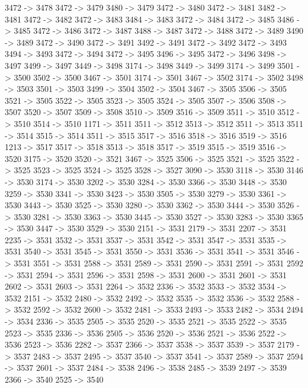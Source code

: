 {	3472 -> 3478
	3472 -> 3479
	3480 -> 3479
	3472 -> 3480
	3472 -> 3481
	3482 -> 3481
	3472 -> 3482
	3472 -> 3483
	3484 -> 3483
	3472 -> 3484
	3472 -> 3485
	3486 -> 3485
	3472 -> 3486
	3472 -> 3487
	3488 -> 3487
	3472 -> 3488
	3472 -> 3489
	3490 -> 3489
	3472 -> 3490
	3472 -> 3491
	3492 -> 3491
	3472 -> 3492
	3472 -> 3493
	3494 -> 3493
	3472 -> 3494
	3472 -> 3495
	3496 -> 3495
	3472 -> 3496
	3498 -> 3497
	3499 -> 3497
	3449 -> 3498
	3174 -> 3498
	3449 -> 3499
	3174 -> 3499
	3501 -> 3500
	3502 -> 3500
	3467 -> 3501
	3174 -> 3501
	3467 -> 3502
	3174 -> 3502
	3498 -> 3503
	3501 -> 3503
	3499 -> 3504
	3502 -> 3504
	3467 -> 3505
	3506 -> 3505
	3521 -> 3505
	3522 -> 3505
	3523 -> 3505
	3524 -> 3505
	3507 -> 3506
	3508 -> 3507
	3520 -> 3507
	3509 -> 3508
	3510 -> 3509
	3516 -> 3509
	3511 -> 3510
	3512 -> 3510
	3514 -> 3510
	1171 -> 3511
	3511 -> 3512
	3513 -> 3512
	3511 -> 3513
	3511 -> 3514
	3515 -> 3514
	3511 -> 3515
	3517 -> 3516
	3518 -> 3516
	3519 -> 3516
	1213 -> 3517
	3517 -> 3518
	3513 -> 3518
	3517 -> 3519
	3515 -> 3519
	3516 -> 3520
	3175 -> 3520
	3520 -> 3521
	3467 -> 3525
	3506 -> 3525
	3521 -> 3525
	3522 -> 3525
	3523 -> 3525
	3524 -> 3525
	3528 -> 3527
	3090 -> 3530
	3118 -> 3530
	3146 -> 3530
	3174 -> 3530
	3202 -> 3530
	3284 -> 3530
	3366 -> 3530
	3448 -> 3530
	3259 -> 3530
	3341 -> 3530
	3423 -> 3530
	3505 -> 3530
	3279 -> 3530
	3361 -> 3530
	3443 -> 3530
	3525 -> 3530
	3280 -> 3530
	3362 -> 3530
	3444 -> 3530
	3526 -> 3530
	3281 -> 3530
	3363 -> 3530
	3445 -> 3530
	3527 -> 3530
	3283 -> 3530
	3365 -> 3530
	3447 -> 3530
	3529 -> 3530
	2151 -> 3531
	2179 -> 3531
	2207 -> 3531
	2235 -> 3531
	3532 -> 3531
	3537 -> 3531
	3542 -> 3531
	3547 -> 3531
	3535 -> 3531
	3540 -> 3531
	3545 -> 3531
	3550 -> 3531
	3536 -> 3531
	3541 -> 3531
	3546 -> 3531
	3551 -> 3531
	2588 -> 3531
	2589 -> 3531
	2590 -> 3531
	2591 -> 3531
	2592 -> 3531
	2594 -> 3531
	2596 -> 3531
	2598 -> 3531
	2600 -> 3531
	2601 -> 3531
	2602 -> 3531
	2603 -> 3531
	2264 -> 3532
	2336 -> 3532
	3533 -> 3532
	3534 -> 3532
	2151 -> 3532
	2480 -> 3532
	2492 -> 3532
	3535 -> 3532
	3536 -> 3532
	2588 -> 3532
	2592 -> 3532
	2600 -> 3532
	2481 -> 3533
	2493 -> 3533
	2482 -> 3534
	2494 -> 3534
	2336 -> 3535
	2505 -> 3535
	2520 -> 3535
	2521 -> 3535
	2522 -> 3535
	2523 -> 3535
	2336 -> 3536
	2505 -> 3536
	2520 -> 3536
	2521 -> 3536
	2522 -> 3536
	2523 -> 3536
	2282 -> 3537
	2366 -> 3537
	3538 -> 3537
	3539 -> 3537
	2179 -> 3537
	2483 -> 3537
	2495 -> 3537
	3540 -> 3537
	3541 -> 3537
	2589 -> 3537
	2594 -> 3537
	2601 -> 3537
	2484 -> 3538
	2496 -> 3538
	2485 -> 3539
	2497 -> 3539
	2366 -> 3540
	2525 -> 3540
}
